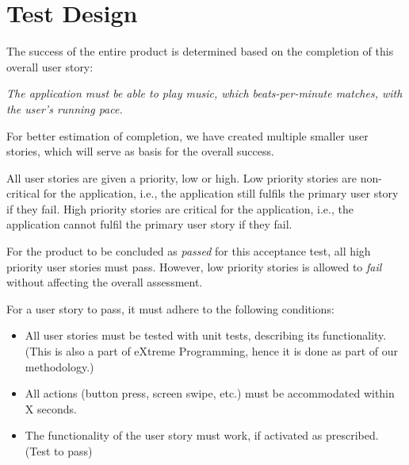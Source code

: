\section{Test Design}
The success of the entire product is determined based on the completion of this overall user story: 

\begin{center}
\textit{The application must be able to play music, which beats-per-minute matches, with the user's running pace.}
\end{center}

For better estimation of completion, we have created multiple smaller user stories, which will serve as basis for the overall success.

All user stories are given a priority, low or high.
Low priority stories are non-critical for the application, i.e., the application still fulfils the primary user story if they fail. 
High priority stories are critical for the application, i.e., the application cannot fulfil the primary user story if they fail. 

For the product to be concluded as \textit{passed} for this acceptance test, all high priority user stories must pass.
However, low priority stories is allowed to \textit{fail} without affecting the overall assessment.

For a user story to pass, it must adhere to the following conditions:

\begin{itemize}
\item All user stories must be tested with unit tests, describing its functionality. (This is also a part of eXtreme Programming, hence it is done as part of our methodology.)
\item All actions (button press, screen swipe, etc.) must be accommodated within X seconds.
\item The functionality of the user story must work, if activated as prescribed. (Test to pass)
\end{itemize}

